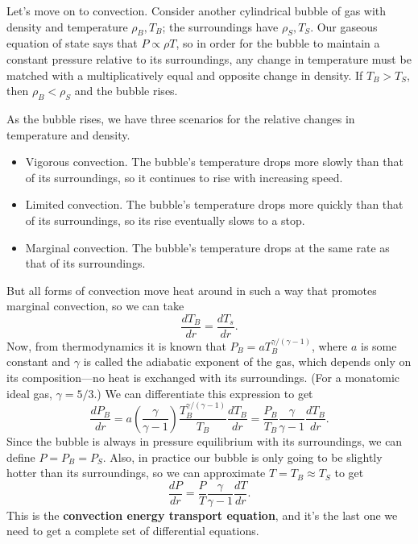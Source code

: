 \documentclass[../a062main.tex]{subfiles}
\begin{document}
Let's move on to convection. %
Consider another cylindrical bubble of gas with density and temperature $\rho_B, T_B$; the surroundings have $\rho_S, T_S$.
Our gaseous equation of state says that $P \propto \rho T$, so in order for the bubble to maintain a constant pressure relative to its surroundings, any change in temperature must be matched with a multiplicatively equal and opposite change in density.
If $T_B > T_S$, then $\rho_B < \rho_S$ and the bubble rises. %

As the bubble rises, we have three scenarios for the relative changes in temperature and density.
\begin{itemize}
    \item Vigorous convection.
    The bubble's temperature drops more slowly than that of its surroundings, so it continues to rise with increasing speed.

    \item Limited convection.
    The bubble's temperature drops more quickly than that of its surroundings, so its rise eventually slows to a stop.

    \item Marginal convection.
    The bubble's temperature drops at the same rate as that of its surroundings.
\end{itemize}
But all forms of convection move heat around in such a way that promotes marginal convection, so we can take
\[ \frac{dT_B}{dr} = \frac{dT_s}{dr}. \]
Now, from thermodynamics it is known that $P_B = a T_B^{\gamma / (\gamma - 1)}$, where $a$ is some constant and $\gamma$ is called the adiabatic exponent of the gas, which depends only on its composition---no heat is exchanged with its surroundings.
(For a monatomic ideal gas, $\gamma = 5 / 3$.)
We can differentiate this expression to get
\[ \frac{dP_B}{dr} = a \left( \frac{\gamma}{\gamma - 1} \right) \frac{T_B^{\gamma / (\gamma - 1)}}{T_B} \frac{dT_B}{dr} = \frac{P_B}{T_B} \frac{\gamma}{\gamma - 1} \frac{dT_B}{dr}. \]
Since the bubble is always in pressure equilibrium with its surroundings, we can define $P = P_B = P_S$.
Also, in practice our bubble is only going to be slightly hotter than its surroundings, so we can approximate $T = T_B \approx T_S$ to get
\[ \boxed{\frac{dP}{dr} = \frac{P}{T} \frac{\gamma}{\gamma - 1} \frac{dT}{dr}}. \]
This is the \textbf{convection energy transport equation}, and it's the last one we need to get a complete set of differential equations.
\end{document}
